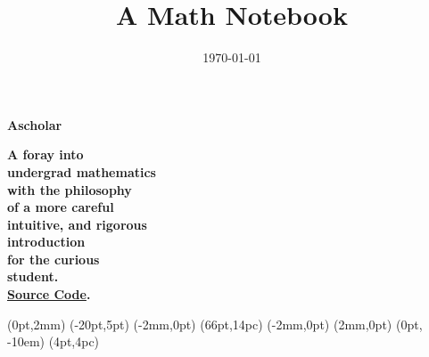 \documentclass[twoside, 12pt]{memoir}
\date{\today}
\title{A Math Notebook}
\begin{document}

\pagestyle{empty}
\setsansfont{Emberly}
  \NewCoffin \result
  \NewCoffin \aaa
  \NewCoffin \bbb
  \NewCoffin \ccc
  \NewCoffin \ddd
  \NewCoffin \eee
  \NewCoffin \fff
  \NewCoffin {}
  \NewCoffin {}
  \NewCoffin {}

\SetHorizontalCoffin \result {}
\SetHorizontalCoffin {}
\SetHorizontalCoffin {}
\SetHorizontalCoffin {}
\SetHorizontalCoffin {}
\SetVerticalCoffin \eee {180pt}
                 {\raggedleft\fontsize{31}{36}\sffamily\bfseries
                 Ascholar}
\SetVerticalCoffin \fff {140pt}
                 {\raggedright \fontsize{13}{14}\sffamily\bfseries
                       A foray into \\
                       undergrad mathematics \\
                       with the philosophy \\
                        of a more careful\\
                       intuitive, and rigorous \\
                       introduction\\
                       for the curious \\
                       student. \\
                       \href{https://github.com/Anonscholar}{Source Code}.\\}

\RotateCoffin {}
\RotateCoffin {}

\SetHorizontalCoffin {}
\SetHorizontalCoffin {}
\SetHorizontalCoffin {}


\JoinCoffins \result                \aaa
\JoinCoffins {} (0pt,2mm)
\JoinCoffins {} \bbb     [B,r](-20pt,5pt)
\JoinCoffins {} (-2mm,0pt)
\JoinCoffins {} \ccc     [B,l](66pt,14pc)
\JoinCoffins {} \fff     [t,r](-2mm,0pt)
\JoinCoffins {} (2mm,0pt)
\JoinCoffins {} \eee     [B,r] (0pt, -10em)
\JoinCoffins {} \ddd     [B,r](4pt,4pc)
\end{document}
